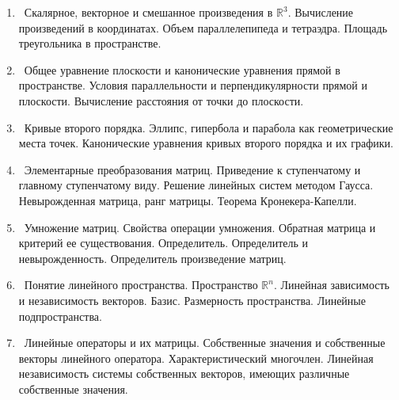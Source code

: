 %
%

\begin{enumerate}

\item Скалярное, векторное и смешанное произведения в $\mathbb{R}^3$. Вычисление произведений в координатах. Объем параллелепипеда и тетраэдра. Площадь треугольника в пространстве.

\item Общее уравнение плоскости и канонические уравнения прямой в пространстве. Условия параллельности и перпендикулярности  прямой и плоскости.  Вычисление расстояния от точки до плоскости.

\item Кривые второго порядка. Эллипс, гипербола и парабола как геометрические места точек. Канонические уравнения кривых второго порядка и их графики.

\item Элементарные преобразования матриц. Приведение к ступенчатому и главному ступенчатому виду. Решение линейных систем методом Гаусса. Невырожденная матрица, ранг матрицы. Теорема Кронекера-Капелли.

\item Умножение матриц.  Свойства операции умножения. Обратная матрица и критерий ее существования. Определитель. Определитель и невырожденность. Определитель  произведение матриц.

\item Понятие линейного пространства. Пространство $\mathbb{R}^n$. Линейная зависимость и независимость векторов. Базис.  Размерность пространства. Линейные подпространства.

\item Линейные операторы и их матрицы.  Собственные значения и собственные векторы линейного оператора. Характеристический многочлен. Линейная независимость системы собственных векторов, имеющих различные собственные значения.

\end{enumerate}





